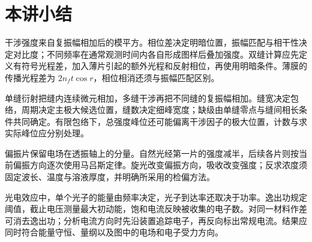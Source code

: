 \section{本讲小结}

干涉强度来自复振幅相加后的模平方。相位差决定明暗位置，振幅匹配与相干性决定对比度；不同频率在通常观测时间内各自形成图样后叠加强度。双缝计算应先定义有符号光程差，加入薄片引起的额外光程和反射相位，再使用明暗条件。薄膜的传播光程差为 $2n_ft\cos r$，相位相消还须与振幅匹配区别。

单缝衍射把缝内连续微元相加，多缝干涉再把不同缝的复振幅相加。缝宽决定包络，周期决定主极大候选位置，缝数决定细峰宽度；缺级由单缝零点与缝间相长条件共同确定。有限包络下，总强度峰位还可能偏离干涉因子的极大位置，计数与求实际峰位应分别处理。

偏振片保留电场在透振轴上的分量。自然光经第一片的强度减半，后续各片则按当前偏振方向逐次使用马吕斯定律。旋光改变偏振方向，吸收改变强度；反求浓度须固定波长、温度与溶液厚度，并明确所采用的检偏方法。

光电效应中，单个光子的能量由频率决定，光子到达率还取决于功率。逸出功规定阈值，截止电压测量最大初动能，饱和电流反映被收集的电子数。对同一材料作差可消去逸出功；分析电流方向时先沿装置追踪电子，再反向标出常规电流。结果应同时符合能量守恒、量纲以及图中的电场和电子受力方向。
